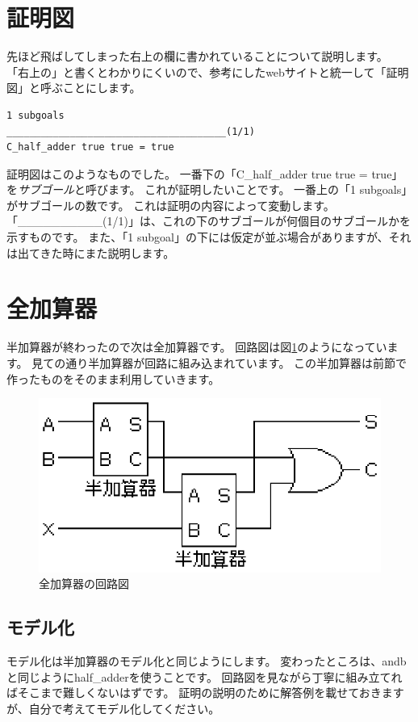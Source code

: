 \documentclass{jsbook}
\begin{document}
\section{証明図}
先ほど飛ばしてしまった右上の欄に書かれていることについて説明します。
「右上の」と書くとわかりにくいので、参考にしたwebサイトと統一して「証明図」と呼ぶことにします。

\begin{verbatim}
1 subgoals
______________________________________(1/1)
C_half_adder true true = true
\end{verbatim}
証明図はこのようなものでした。
一番下の「C\_half\_adder true true = true」を\emph{サブゴール}と呼びます。
これが証明したいことです。
一番上の「1 subgoals」がサブゴールの数です。
これは証明の内容によって変動します。
「\_\_\_\_\_\_\_\_\_\_(1/1)」は、これの下のサブゴールが何個目のサブゴールかを示すものです。
また、「1 subgoal」の下には仮定が並ぶ場合がありますが、それは出てきた時にまた説明します。

\section{全加算器}
半加算器が終わったので次は全加算器です。
回路図は図\ref{full_adder}のようになっています。
見ての通り半加算器が回路に組み込まれています。
この半加算器は前節で作ったものをそのまま利用していきます。
\begin{figure}[htbp]
\begin{center}
  \includegraphics[scale=1.0]{image/full_adder.eps}
  \caption{全加算器の回路図 \protect \footnotemark}
  \label{full_adder}
\end{center}
\end{figure}
\subsection*{モデル化}
モデル化は半加算器のモデル化と同じようにします。
変わったところは、andbと同じようにhalf\_adderを使うことです。
回路図を見ながら丁寧に組み立てればそこまで難しくないはずです。
証明の説明のために解答例を載せておきますが、自分で考えてモデル化してください。
\end{document}
